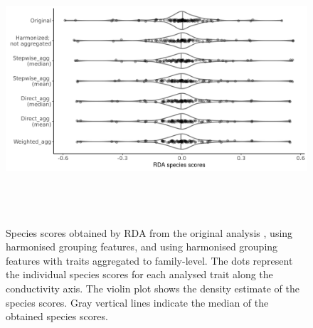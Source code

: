 \documentclass{article}
\begin{document}
\begin{figure}[H]
    \label{fig:rda_species_scores}
    \centering
    \includegraphics[width=16.5cm, height=10cm]{Species_scores_rda.png}
    \caption{Species scores obtained by RDA from the original analysis \cite{szocs_effects_2014}, using harmonised grouping features, and using harmonised grouping features with traits aggregated to family-level. The dots represent the individual species scores for each analysed trait along the conductivity axis. The violin plot shows the density estimate of the species scores. Gray vertical lines indicate the median of the obtained species scores.}
\end{figure}
\end{document}
